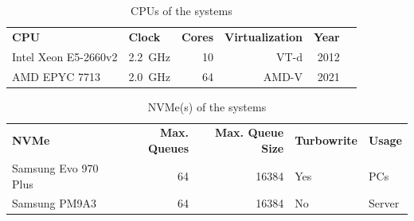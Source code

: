 \begin{table}
    \centering
    \begin{tabular}{llrrrr}
        \multirow{2}{*}{\textbf{CPU}} & \multirow{2}{*}{\textbf{Clock}} & \multirow{2}{*}{\textbf{Cores}} & \multirow{2}{*}{\textbf{Virtualization}} & \multirow{2}{*}{\textbf{Year}}
        \\
                                      &                                 &                                 &                                          &                                \\
        \toprule

        Intel Xeon E5-2660v2          & \SI{2.2}{\giga\Hz}              & 10                              & VT-d                                     & 2012                           \\
        AMD EPYC 7713                 & \SI{2.0}{\giga\Hz}              & 64                              & AMD-V                                    & 2021                           \\

        \bottomrule
    \end{tabular}

    \caption{CPUs of the systems}
    \label{tab:cpus}
\end{table}

\begin{table}
    \centering
    \begin{tabular}{lrrll}
        \multirow{2}{*}{\textbf{NVMe}} & \multirow{2}{*}{\textbf{Max. Queues}} & \multirow{2}{*}{\textbf{Max. Queue Size}} & \multirow{2}{*}{\textbf{Turbowrite}} & \multirow{2}{*}{\textbf{Usage}}
        \\
                                       &                                       &                                           &                                      &                                 \\
        \toprule

        Samsung Evo 970 Plus           & 64                                    & 16384                                     & Yes                                  & PCs                             \\
        Samsung PM9A3                  & 64                                    & 16384                                     & No                                   & Server                          \\

        \bottomrule
    \end{tabular}

    \caption{NVMe(s) of the systems}
    \label{tab:nvmes}
\end{table}

